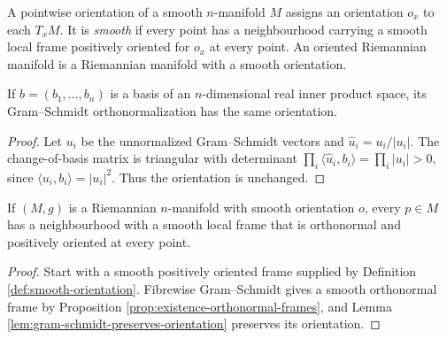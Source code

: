 \begin{definition}
\label{def:smooth-orientation}




A pointwise orientation of a smooth $n$-manifold $M$ assigns an orientation $o_x$ to each $T_xM$. It is \emph{smooth} if every point has a neighbourhood carrying a smooth local frame positively oriented for $o_x$ at every point. An oriented Riemannian manifold is a Riemannian manifold with a smooth orientation.
\end{definition}

\begin{lemma}
\label{lem:gram-schmidt-preserves-orientation}




If $b=(b_1,\ldots,b_n)$ is a basis of an $n$-dimensional real inner product space, its Gram--Schmidt orthonormalization has the same orientation.
\end{lemma}

\begin{proof}

\sketch Let $u_i$ be the unnormalized Gram--Schmidt vectors and $\widehat u_i=u_i/|u_i|$. The change-of-basis matrix is triangular with determinant $\prod_i\langle\widehat u_i,b_i\rangle=\prod_i|u_i|>0$, since $\langle u_i,b_i\rangle=|u_i|^2$. Thus the orientation is unchanged.
\end{proof}

\begin{proposition}
\label{prop:oriented-orthonormal-frames}





If $(M,g)$ is a Riemannian $n$-manifold with smooth orientation $o$, every $p\in M$ has a neighbourhood with a smooth local frame that is orthonormal and positively oriented at every point.
\end{proposition}

\begin{proof}

\sketch Start with a smooth positively oriented frame supplied by Definition \ref{def:smooth-orientation}. Fibrewise Gram--Schmidt gives a smooth orthonormal frame by Proposition \ref{prop:existence-orthonormal-frames}, and Lemma \ref{lem:gram-schmidt-preserves-orientation} preserves its orientation.
\end{proof}

